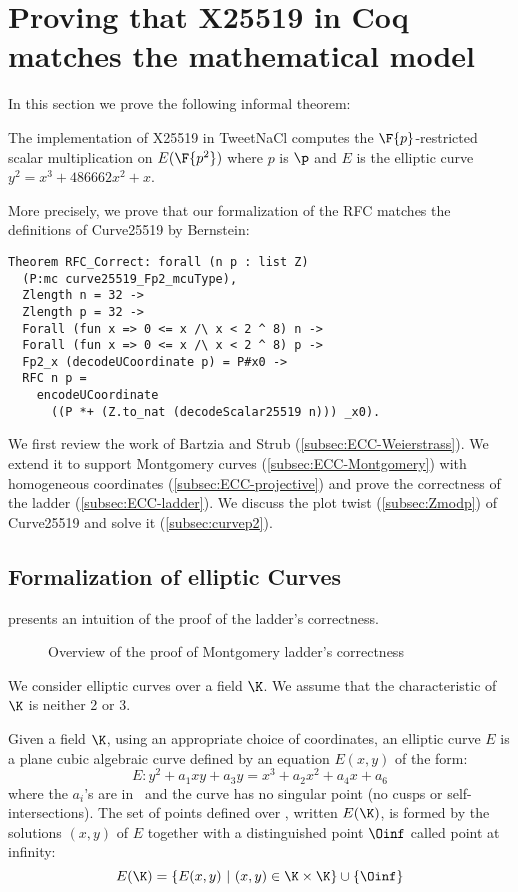 \section{Proving that X25519 in Coq matches the mathematical model}
\label{sec:maths}

In this section we prove the following informal theorem:

\begin{informaltheorem}
The implementation of X25519 in TweetNaCl computes the
$\F{p}$-restricted \xcoord scalar multiplication on $E(\F{p^2})$ where $p$ is $\p$
and $E$ is the elliptic curve $y^2 = x^3 + 486662 x^2 + x$.
\end{informaltheorem}

More precisely, we prove that our formalization of the RFC matches the definitions of Curve25519 by Bernstein:
\begin{lstlisting}[language=Coq]
Theorem RFC_Correct: forall (n p : list Z)
  (P:mc curve25519_Fp2_mcuType),
  Zlength n = 32 ->
  Zlength p = 32 ->
  Forall (fun x => 0 <= x /\ x < 2 ^ 8) n ->
  Forall (fun x => 0 <= x /\ x < 2 ^ 8) p ->
  Fp2_x (decodeUCoordinate p) = P#x0 ->
  RFC n p =
    encodeUCoordinate
      ((P *+ (Z.to_nat (decodeScalar25519 n))) _x0).
\end{lstlisting}

We first review the work of Bartzia and Strub \cite{BartziaS14} (\ref{subsec:ECC-Weierstrass}).
We extend it to support Montgomery curves (\ref{subsec:ECC-Montgomery})
with homogeneous coordinates (\ref{subsec:ECC-projective}) and prove the
correctness of the ladder (\ref{subsec:ECC-ladder}).
We discuss the plot twist (\ref{subsec:Zmodp}) of Curve25519 and solve it (\ref{subsec:curvep2}).

\subsection{Formalization of elliptic Curves}
\label{subsec:ECC}

 presents an intuition of the proof of the ladder's
correctness.
\begin{figure}[h]
  \centering
  
  \caption{Overview of the proof of Montgomery ladder's correctness}
  \label{tikz:ProofHighLevel1}
\end{figure}

We consider elliptic curves over a field $\K$. We assume that the
characteristic of $\K$ is neither 2 or 3.

\begin{dfn}
Given a field $\K$,
using an appropriate choice of coordinates,
an elliptic curve $E$
is a plane cubic algebraic curve defined by an equation $E(x,y)$ of the form:
$$E : y^2 + a_1 xy + a_3 y = x^3 + a_2 x^2 + a_4 x + a_6$$
where the $a_i$'s are in \K\ and the curve has no singular point (\ie no cusps
or self-intersections). The set of points defined over \K, written $E(\K)$, is formed by the
solutions $(x,y)$ of $E$ together with a distinguished point $\Oinf$ called point at infinity:
$$E(\K) = \{ E(x,y)~|~(x,y) \in \K \times \K\} \cup \{\Oinf\}$$
\end{dfn}

